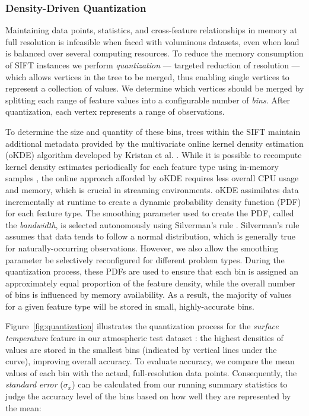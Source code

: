 \subsubsection{Density-Driven Quantization}
Maintaining data points, statistics, and cross-feature relationships in memory at full resolution is infeasible when faced with voluminous datasets, even when load is balanced over several computing resources. To reduce the memory consumption of SIFT instances we perform \emph{quantization} --- targeted reduction of resolution --- which allows vertices in the tree to be merged, thus enabling single vertices to represent a collection of values. We determine which vertices should be merged by splitting each range of feature values into a configurable number of \emph{bins}. After quantization, each vertex represents a range of observations.

To determine the size and quantity of these bins, trees within the SIFT maintain additional metadata provided by the multivariate online kernel density estimation (oKDE) algorithm developed by Kristan et al. \cite{kristan2011multivariate}. While it is possible to recompute kernel density estimates periodically for each feature type using in-memory samples \cite{malensek2013autonomously}, the online approach afforded by oKDE requires less overall CPU usage and memory, which is crucial in streaming environments.  oKDE assimilates data incrementally at runtime to create a dynamic probability density function (PDF) for each feature type. The smoothing parameter used to create the PDF, called the \emph{bandwidth}, is selected autonomously using Silverman's rule \cite{silverman1986density}. Silverman's rule assumes that data tends to follow a normal distribution, which is generally true for naturally-occurring observations. However, we also allow the smoothing parameter be selectively reconfigured for different problem types. During the quantization process, these PDFs are used to ensure that each bin is assigned an approximately equal proportion of the feature density, while the overall number of bins is influenced by memory availability. As a result, the majority of values for a given feature type will be stored in small, highly-accurate bins.

Figure~\ref{fig:quantization} illustrates the quantization process for the \emph{surface temperature} feature in our atmospheric test dataset \cite{noaa_nam}: the highest densities of values are stored in the smallest bins (indicated by vertical lines under the curve), improving overall accuracy. To evaluate accuracy, we compare the mean values of each bin with the actual, full-resolution data points. Consequently, the \emph{standard error} ($\sigma_{\bar{x}}$) can be calculated from our running summary statistics to judge the accuracy level of the bins based on how well they are represented by the mean:

